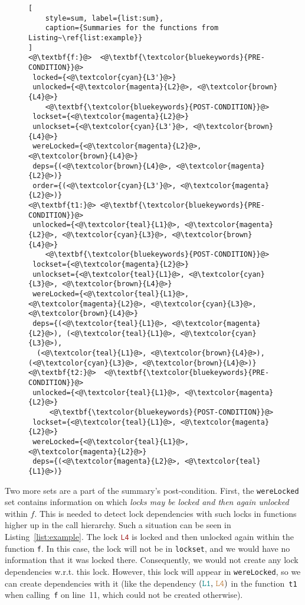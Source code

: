 \documentclass[runningheads]{llncs}
\begin{document}
\begin{wrapfigure}{l}{.34 \textwidth}
\vspace*{-9mm}
\begin{lstlisting}[
    style=sum, label={list:sum},
    caption={Summaries for the functions from Listing~\ref{list:example}}
]
<@\textbf{f:}@>  <@\textbf{\textcolor{bluekeywords}{PRE-CONDITION}}@>
 locked={<@\textcolor{cyan}{L3'}@>}
 unlocked={<@\textcolor{magenta}{L2}@>, <@\textcolor{brown}{L4}@>}
    <@\textbf{\textcolor{bluekeywords}{POST-CONDITION}}@>
 lockset={<@\textcolor{magenta}{L2}@>}
 unlockset={<@\textcolor{cyan}{L3'}@>, <@\textcolor{brown}{L4}@>}
 wereLocked={<@\textcolor{magenta}{L2}@>, <@\textcolor{brown}{L4}@>}
 deps={(<@\textcolor{brown}{L4}@>, <@\textcolor{magenta}{L2}@>)}
 order={(<@\textcolor{cyan}{L3'}@>, <@\textcolor{magenta}{L2}@>)}
<@\textbf{t1:}@> <@\textbf{\textcolor{bluekeywords}{PRE-CONDITION}}@>
 unlocked={<@\textcolor{teal}{L1}@>, <@\textcolor{magenta}{L2}@>, <@\textcolor{cyan}{L3}@>, <@\textcolor{brown}{L4}@>}
    <@\textbf{\textcolor{bluekeywords}{POST-CONDITION}}@>
 lockset={<@\textcolor{magenta}{L2}@>}
 unlockset={<@\textcolor{teal}{L1}@>, <@\textcolor{cyan}{L3}@>, <@\textcolor{brown}{L4}@>}
 wereLocked={<@\textcolor{teal}{L1}@>, <@\textcolor{magenta}{L2}@>, <@\textcolor{cyan}{L3}@>, <@\textcolor{brown}{L4}@>}
 deps={(<@\textcolor{teal}{L1}@>, <@\textcolor{magenta}{L2}@>), (<@\textcolor{teal}{L1}@>, <@\textcolor{cyan}{L3}@>),
  (<@\textcolor{teal}{L1}@>, <@\textcolor{brown}{L4}@>), (<@\textcolor{cyan}{L3}@>, <@\textcolor{brown}{L4}@>)}
<@\textbf{t2:}@>  <@\textbf{\textcolor{bluekeywords}{PRE-CONDITION}}@>
 unlocked={<@\textcolor{teal}{L1}@>, <@\textcolor{magenta}{L2}@>}
     <@\textbf{\textcolor{bluekeywords}{POST-CONDITION}}@>
 lockset={<@\textcolor{teal}{L1}@>, <@\textcolor{magenta}{L2}@>}
 wereLocked={<@\textcolor{teal}{L1}@>, <@\textcolor{magenta}{L2}@>}
 deps={(<@\textcolor{magenta}{L2}@>, <@\textcolor{teal}{L1}@>)}
\end{lstlisting}
\vspace*{-11mm}
\end{wrapfigure}

Two more sets are a part of the summary's post-condition. First, the
\texttt{wereLocked} set contains information on which \emph{locks may be locked
and then again unlocked} within $f$. This is needed to detect lock dependencies
with such locks in functions higher up in the call hierarchy. Such a situation
can be seen in Listing~\ref{list:example}. The lock
\texttt{\textcolor{brown}{L4}} is locked and then unlocked again within the
function \texttt{f}. In this case, the lock will not be in \texttt{lockset}, and
we would have no information that it was locked there. Consequently, we would
not create any lock dependencies w.r.t. this lock. However, this lock will
appear in \texttt{wereLocked}, so we can create dependencies with it (like the
dependency $(\text{\texttt{\textcolor{teal}{L1}},
\texttt{\textcolor{brown}{L4}}})$ in the function~\texttt{t1} when
calling~\texttt{f} on line~11, which could not be created otherwise).
\end{document}
